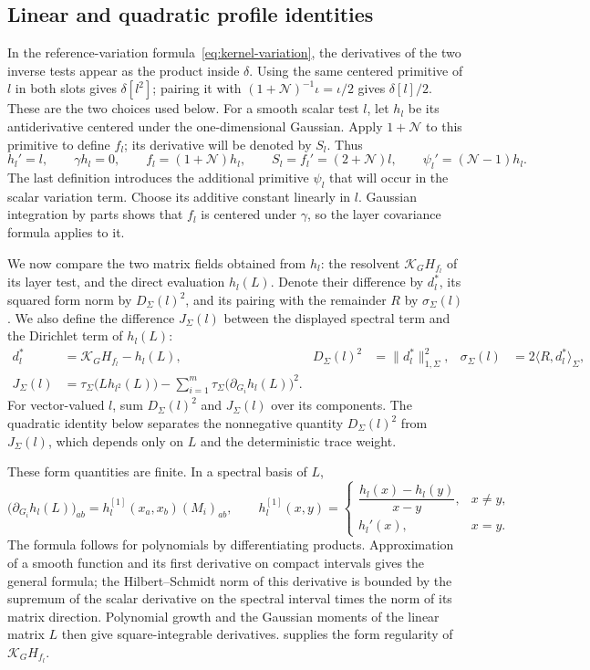 \subsection{Linear and quadratic profile identities}

In the reference-variation formula~\eqref{eq:kernel-variation}, the derivatives of the two inverse tests appear as the product inside $\delta$. Using the same centered primitive of $l$ in both slots gives $\delta[l^2]$; pairing it with $(1+\mathcal{N})^{-1}\iota=\iota/2$ gives $\delta[l]/2$. These are the two choices used below. For a smooth scalar test $l$, let $h_l$ be its antiderivative centered under the one-dimensional Gaussian. Apply $1+\mathcal{N}$ to this primitive to define $f_l$; its derivative will be denoted by $S_l$. Thus
\[
 h_l'=l,\qquad \gamma h_l=0,\qquad
 f_l=(1+\mathcal{N})h_l,\qquad S_l=f_l'=(2+\mathcal{N})l,
 \qquad \psi_l'=(\mathcal{N}-1)h_l.
\]
The last definition introduces the additional primitive $\psi_l$ that will occur in the scalar variation term. Choose its additive constant linearly in $l$. Gaussian integration by parts shows that $f_l$ is centered under $\gamma$, so the layer covariance formula applies to it.

We now compare the two matrix fields obtained from $h_l$: the resolvent $\mathcal{K}_GH_{f_l}$ of its layer test, and the direct evaluation $h_l(L)$. Denote their difference by $d_l^*$, its squared form norm by $D_\Sigma(l)^2$, and its pairing with the remainder $R$ by $\sigma_\Sigma(l)$. We also define the difference $J_\Sigma(l)$ between the displayed spectral term and the Dirichlet term of $h_l(L)$:
\[
 \begin{aligned}
 d_l^*&=\mathcal{K}_GH_{f_l}-h_l(L),&
 D_\Sigma(l)^2&=\|d_l^*\|_{1,\Sigma}^2,&
 \sigma_\Sigma(l)&=2\langle R,d_l^*\rangle_\Sigma,\\
 J_\Sigma(l)&=\tau_\Sigma\bigl(Lh_{l^2}(L)\bigr)
       -\sum_{i=1}^m\tau_\Sigma
                   \bigl(\partial_{G_i}h_l(L)\bigr)^2 .
 \end{aligned}
\]
For vector-valued $l$, sum $D_\Sigma(l)^2$ and $J_\Sigma(l)$ over its components. The quadratic identity below separates the nonnegative quantity $D_\Sigma(l)^2$ from $J_\Sigma(l)$, which depends only on $L$ and the deterministic trace weight.

These form quantities are finite. In a spectral basis of $L$,
\[
 \bigl(\partial_{G_i}h_l(L)\bigr)_{ab}
   =h_l^{[1]}(x_a,x_b)(M_i)_{ab},\qquad
 h_l^{[1]}(x,y)=
 \begin{cases}
  \dfrac{h_l(x)-h_l(y)}{x-y},&x\ne y,\\
  h_l'(x),&x=y.
 \end{cases}
\]
The formula follows for polynomials by differentiating products. Approximation of a smooth function and its first derivative on compact intervals gives the general formula; the Hilbert--Schmidt norm of this derivative is bounded by the supremum of the scalar derivative on the spectral interval times the norm of its matrix direction. Polynomial growth and the Gaussian moments of the linear matrix $L$ then give square-integrable derivatives.  supplies the form regularity of $\mathcal{K}_GH_{f_l}$.

